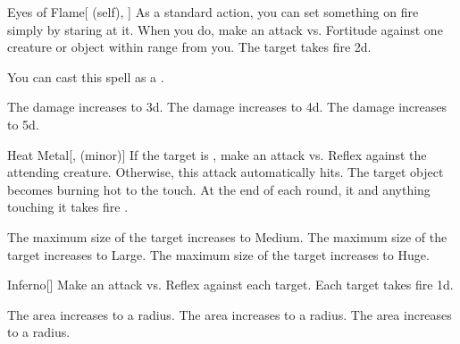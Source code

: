 \lowercase{\hypertarget{spell:Eyes of Flame}{}}\label{spell:Eyes of Flame}
\begin{attuneability}[Rank 2]{\hypertarget{spell:Eyes of Flame}{Eyes of Flame}}[ (self), ]
As a standard action, you can set something on fire simply by staring at it.
When you do, make an attack vs. Fortitude against one creature or object within \rngmed range from you.
\hit The target takes fire  \plus2d.

You can cast this spell as a .

\rankline
{} The damage increases to  \plus3d.
 The damage increases to  \plus4d.
 The damage increases to  \plus5d.

\end{attuneability}
\vspace{0.25em}



\lowercase{\hypertarget{spell:Heat Metal}{}}\label{spell:Heat Metal}
\begin{freeability}[Rank 2]{\hypertarget{spell:Heat Metal}{Heat Metal}}[,  (minor)]
If the target is , make an attack vs. Reflex against the attending creature.
Otherwise, this attack automatically hits.
\hit The target object becomes burning hot to the touch.
At the end of each round, it and anything touching it takes fire .

\rankline
{} The maximum size of the target increases to Medium.
 The maximum size of the target increases to Large.
 The maximum size of the target increases to Huge.

\end{freeability}
\vspace{0.25em}



\lowercase{\hypertarget{spell:Inferno}{}}\label{spell:Inferno}
\begin{freeability}[Rank 2]{\hypertarget{spell:Inferno}{Inferno}}[]
Make an attack vs. Reflex against each target.
\hit Each target takes fire  \minus1d.

\rankline
{} The area increases to a \arealarge radius.
 The area increases to a \areahuge radius.
 The area increases to a \areaext radius.

\end{freeability}
\vspace{0.25em}



